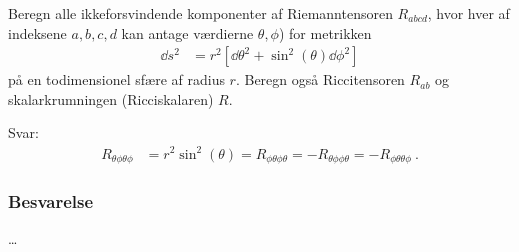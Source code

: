 \documentclass[../main.tex]{subfiles}
\begin{document}
Beregn alle ikkeforsvindende komponenter af Riemanntensoren $R_{abcd}$, hvor hver af indeksene $a,b,c,d$ kan antage værdierne $\theta,\phi$) for metrikken
\begin{align}
    \dd s^2 &= r^2 \left[ \dd \theta^2 + \sin^2(\theta) \dd \phi^2 \right]
\end{align}
på en todimensionel sfære af radius $r$. Beregn også Riccitensoren $R_{ab}$ og skalarkrumningen (Ricciskalaren) $R$.

Svar:
\begin{align}
    R_{\theta\phi\theta\phi} &= r^2 \sin^2(\theta)
        = R_{\phi\theta\phi\theta}
        = - R_{\theta\phi\phi\theta}
        = - R_{\phi\theta\theta\phi} \: .
\end{align}


\subsubsection{Besvarelse}

\ldots



\end{document}
